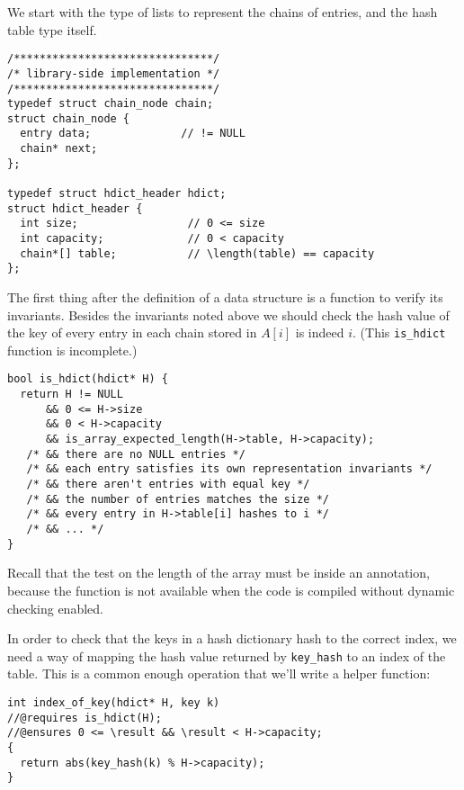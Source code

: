 We start with the type of lists to represent the chains of entries,
and the hash table type itself.
\begin{lstlisting}[language={[C0]C}]
/*******************************/
/* library-side implementation */
/*******************************/
typedef struct chain_node chain;
struct chain_node {
  entry data;              // != NULL
  chain* next;
};

typedef struct hdict_header hdict;
struct hdict_header {
  int size;                 // 0 <= size
  int capacity;             // 0 < capacity
  chain*[] table;           // \length(table) == capacity
};
\end{lstlisting}
The first thing after the definition of a data structure is a function
to verify its invariants.  Besides the invariants noted above we
should check
the hash value of the key of every entry in each chain stored in
$A[i]$ is indeed $i$. (This \lstinline'is_hdict' function is
incomplete.)

\begin{lstlisting}[language={[C0]C}]
bool is_hdict(hdict* H) {
  return H != NULL
      && 0 <= H->size
      && 0 < H->capacity
      && is_array_expected_length(H->table, H->capacity);
   /* && there are no NULL entries */
   /* && each entry satisfies its own representation invariants */
   /* && there aren't entries with equal key */
   /* && the number of entries matches the size */
   /* && every entry in H->table[i] hashes to i */
   /* && ... */
}
\end{lstlisting}
Recall that the test on the length of the array must be inside an
annotation, because the \length{} function is not available when
the code is compiled without dynamic checking enabled.

In order to check that the keys in a hash dictionary hash to the correct
index, we need a way of mapping the hash value returned by
\lstinline'key_hash' to an index of the table.  This is a common enough
operation that we'll write a helper function:
\begin{lstlisting}[language={[C0]C}]
int index_of_key(hdict* H, key k)
//@requires is_hdict(H);
//@ensures 0 <= \result && \result < H->capacity;
{
  return abs(key_hash(k) % H->capacity);
}
\end{lstlisting}

